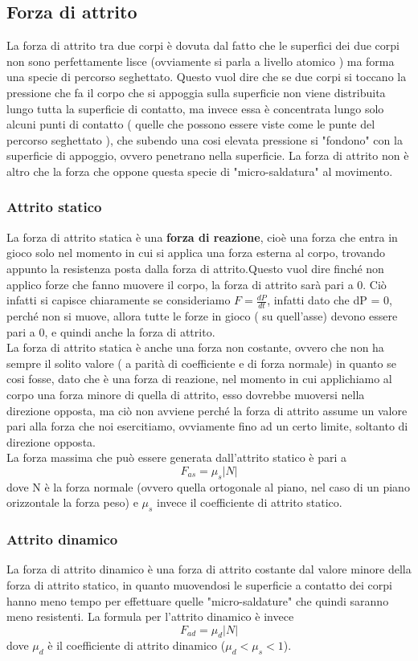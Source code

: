 \documentclass[portrait]{article}
\begin{document}
\subsection{Forza di attrito}
La forza di attrito tra due corpi è dovuta dal fatto che le superfici dei due corpi non sono perfettamente lisce (ovviamente si parla a livello atomico ) ma forma una specie di percorso seghettato. Questo vuol dire che se due corpi si toccano la pressione che fa il corpo che si appoggia sulla superficie non viene distribuita lungo tutta la superficie di contatto, ma invece essa è concentrata lungo solo alcuni punti di contatto ( quelle che possono essere viste come le punte del percorso seghettato ), che subendo una cosi elevata pressione si "fondono" con la superficie di appoggio, ovvero penetrano nella superficie. La forza di attrito non è altro che la forza che oppone questa specie di "micro-saldatura" al movimento. \\ 
\subsubsection{Attrito statico}
La forza di attrito statica è una \textbf{forza di reazione}, cioè una forza che entra in gioco solo nel momento in cui si applica una forza esterna al corpo, trovando appunto la resistenza posta dalla forza di attrito.Questo vuol dire finché non applico forze che fanno muovere il corpo, la forza di attrito sarà pari a 0. Ciò infatti si capisce chiaramente se consideriamo $F = \frac{dP}{dt}$, infatti dato che dP = 0, perché non si muove, allora tutte le forze in gioco ( su quell'asse) devono essere pari a 0, e quindi anche la forza di attrito.\\
La forza di attrito statica è anche una forza non costante, ovvero che non ha sempre il solito valore ( a parità di coefficiente e di forza normale) in quanto se cosi fosse, dato che è una forza di reazione, nel momento in cui applichiamo al corpo una forza minore di quella di attrito, esso dovrebbe muoversi nella direzione opposta, ma ciò non avviene perché la forza di attrito assume un valore pari alla forza che noi esercitiamo, ovviamente fino ad un certo limite, soltanto di direzione opposta. \\
La forza massima che può essere generata dall'attrito statico è pari a 
$$F_{as} =\mu_s |N| $$
dove N è la forza normale (ovvero quella ortogonale al piano, nel caso di un piano orizzontale la forza peso) e $\mu_s$ invece il coefficiente di attrito statico.
\subsubsection{Attrito dinamico}
La forza di attrito dinamico è una forza di attrito costante dal valore minore della forza di attrito statico, in quanto muovendosi le superficie a contatto dei corpi hanno meno tempo per effettuare quelle "micro-saldature" che quindi saranno meno resistenti. La formula per l'attrito dinamico è invece 
$$F_{ad} = \mu_d|N|$$
dove $\mu_d$ è il coefficiente di attrito dinamico ($\mu_d < \mu_s < 1$).
\end{document}
